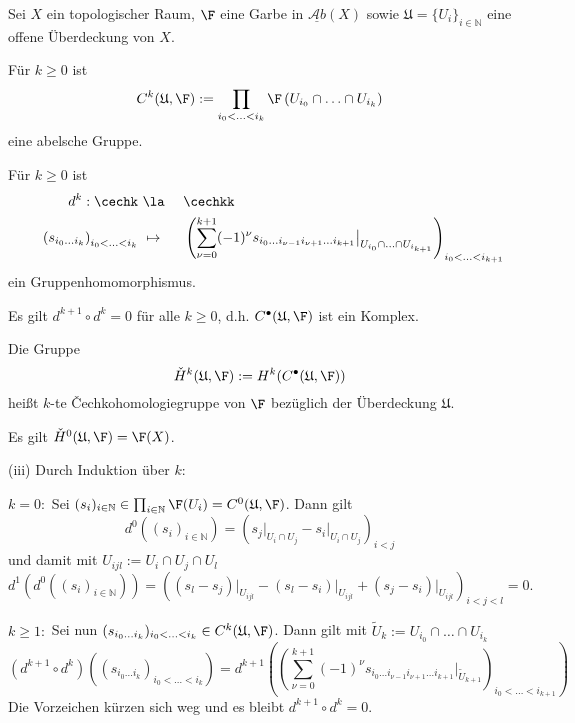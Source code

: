 \documentclass[11pt]{book}
\theoremstyle{nonumberbreak}
\newenvironment{pr}[1][]{\ifthenelse{\equal{#1}{}}{\proof}{\proof[#1]}\rm}{\endproof}
\newenvironment{definbem}[1][]{\ifthenelse{\equal{#1}{}}{\definibem}{\definibem[#1]}\rm}{\enddefinibem}
\newcommand{\AbX}{\underline{\mathcal{A}b}(X)}
\begin{document}
\begin{spacing}{1.4}
\begin{definbem}     %
Sei $X$ ein topologischer Raum, $\F$ eine Garbe in $\AbX$ sowie $\mathfrak{U} = \{U_i\}_{i \in \mathbb{N}}$ eine offene Überdeckung von $X$.
\begin{compactenum}
\item Für $k \geqslant 0$ ist
$$C^{k}( \mathfrak{U}, \F) := \prod_{i_0 < \ldots < i_k} \F\left(U_{i_0} \cap \ldots \cap U_{i_k}\right)$$
eine abelsche Gruppe.
\item Für $k \geqslant 0$ ist
\setlength{\abovedisplayskip}{5.5pt}
\setlength{\belowdisplayskip}{5.5pt}
\begin{alignat*}{5}
d^{k}: \cechk \ &\la&& \ \cechkk \\
 \qquad \left(s_{i_0\ldots i_k}\right)_{i_0 < \ldots < i_k} \ &\mapsto&&\ \left( \sum_{\nu =0}^{k+1} (-1)^{\nu} s_{i_0 \ldots i_{\nu-1} i_{\nu+1} \ldots i_{k+1}} \big\vert_{U_{i_0} \cap \ldots \cap U_{i_{k+1}}} \right)_{i_0 < \ldots < i_{k+1}}
 \end{alignat*}
 ein  Gruppenhomomorphismus.
 \item Es gilt $d^{k+1} \circ d^{k} =0$ für alle $k \geqslant 0$, d.h. $C^{\bullet}(\mathfrak{U}, \F)$ ist ein Komplex.
 \item Die Gruppe
 $$\check{H}^{k}(\mathfrak{U}, \F) := H^{k}(C^{\bullet}(\mathfrak{U}, \F))$$
 heißt $k$-te \v{C}echkohomologiegruppe von $\F$ bezüglich der Überdeckung $\mathfrak{U}$. 
 \item Es gilt $\check{H}^{0}(\mathfrak{U}, \F) = \F(X)$. 
\end{compactenum}
\begin{pr}
\begin{compactenum}
\item[(iii)] Durch Induktion über $k$:
\begin{compactenum}
\item[$k=0:$] Sei $(s_i)_{i \in \mathbb{N}} \in \prod_{i \in \mathbb{N}} \F(U_i)= C^{0}(\mathfrak{U}, \F)$. Dann gilt
$$d^{0}((s_i)_{i \in \mathbb{N}}) = (s_j \vert_{U_i \cap U_j} - s_i \vert_{U_i \cap U_j})_{i <j}$$
und damit mit $U_{ijl} := U_i \cap U_j \cap U_l$
$$d^{1} \left(d^{0}((s_i)_{i \in \mathbb{N}})\right) = \left((s_l-s_j) \vert_{U_{ijl}} - (s_l-s_i)\vert_{U_{ijl}} + (s_j - s_i)\vert_{U_{ijl}} \right)_{i<j<l} = 0.$$

\item[$k\geqslant 1:$] Sei nun $(s_{i_0 \ldots i_k})_{i_0 < \ldots <i_k} \in C^{k}(\mathfrak{U}, \F)$. Dann gilt mit $\tilde{U}_{k} := U_{i_0} \cap \ldots \cap U_{i_k}$  
 $$(d^{k+1} \circ d^{k})\left((s_{i_0 \ldots i_k})_{i_0 < \ldots <i_k}\right) = d^{k+1} \left(\left( \sum_{\nu =0}^{k+1} (-1)^{\nu} s_{i_0 \ldots i_{\nu-1} i_{\nu+1} \ldots i_{k+1}} \big\vert_{\tilde{U}_{k+1}} \right)_{i_0 < \ldots < i_{k+1}}\right)$$
 Die Vorzeichen kürzen sich weg und es bleibt $d^{k+1} \circ d^k = 0$.



\end{compactenum}
\end{compactenum}
\end{pr}
\end{definbem}
\end{spacing}
\end{document}
